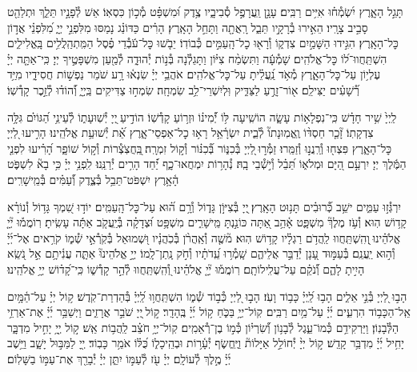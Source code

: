 \documentclass[twoside, openany, parskip=half, 11pt]{book}
\begin{document}
תָּגֵ֣ל הָאָ֑רֶץ יִ֝שְׂמְ֯ח֗וּ אִיִּ֥ים רַבִּֽים׃
עָנָ֣ן וַֽעֲרָפֶ֣ל סְ֯בִיבָ֑יו צֶ֥דֶק וּ֝מִשְׁפָּ֗ט מְ֯כ֣וֹן כִּסְאֽוֹ׃
אֵשׁ לְ֯פָנָ֣יו תֵּלֵ֑ךְ וּתְלַהֵ֖ט סָבִ֣יב צָרָֽיו׃
הֵאִ֣ירוּ בְ֯רָקָ֣יו תֵּבֵ֑ל רָֽאֲתָ֖ה וַתָּחֵ֣ל הָאָֽרֶץ׃
הָרִ֗ים כַּדּוֹנַ֗ג נָמַסּוּ מִלִּפְנֵ֣י יְיָ֑ מִ֝לִּפְנֵ֗י אֲד֣וֹן כׇּל־הָאָֽרֶץ׃
הִגִּ֣ידוּ הַשָּׁמַ֣יִם צִדְק֑וֹ וְ֯רָא֖וּ כׇל־הָֽעַמִּ֣ים כְּ֯בוֹדֽוֹ׃
יֵבֹ֤שׁוּ כׇּל־עֹ֬בְ֯דֵי פֶ֗סֶל הַמִּֽתְהַֽלֲלִ֥ים בָּֽאֱלִילִ֑ים הִשְׁתַּֽחֲווּ־ל֝וֹ כׇּל־אֱלֹהִֽים׃
שָׁמְ֯עָ֬ה וַתִּשְׂמַ֨ח צִיּ֗וֹן וַתָּגֵלְ֯נָה בְּ֯נ֣וֹת יְ֯הוּדָ֑ה לְ֯מַ֖עַן מִשְׁפָּטֶ֣יךָ יְיָ׃
כִּֽי־אַתָּ֤ה יְיָ֗ עֶלְי֥וֹן עַל־כׇּל־הָאָ֑רֶץ מְ֯אֹ֥ד נַֽ֝עֲלֵ֗יתָ עַל־כׇּל־אֱלֹהִֽים׃
אֹהֲבֵ֥י יְיָ֗ שִׂנְא֫וּ רָ֥ע שֹׁמֵר נַפְשׁ֣וֹת חֲסִידָ֑יו מִיַּ֥ד רְ֝֯שָׁעִ֗ים יַצִּילֵֽם׃
א֖וֹר־זָרֻ֣עַ לַצַּדִּ֑יק וּֽלְיִשְׁרֵי־לֵ֥ב שִׂמְחָֽה׃
שִׂמְח֣וּ צַדִּיקִים בַּֽיְיָ֑ וְ֝֯הוֹד֗וּ לְ֯זֵ֣כֶר קָדְ֯שֽׁוֹ׃


לַֽיְיָ֙ שִׁ֥יר חָדָ֗שׁ כִּֽי־נִפְלָא֥וֹת עָשָׂ֑ה הוֹשִֽׁיעָה לּ֥וֹ יְ֝֯מִינ֗וֹ וּזְר֥וֹעַ קָדְ֯שֽׁוֹ׃
הוֹדִ֣יעַ ֖יְיָ יְ֯שֽׁוּעָת֑וֹ לְ֯עֵינֵ֥י הַ֝גּוֹיִ֗ם גִּלָּ֥ה צִדְקָתֽוֹ׃
זָ֘כַ֤ר חַסְדּ֨וֹ וֶֽאֱמֽוּנָתוֹ֘ לְ֯בֵ֢ית יִשְׂרָ֫אֵ֥ל רָא֥וּ כׇל־אַפְסֵי־אָ֑רֶץ אֵ֝֗ת יְ֯שׁוּעַ֥ת אֱלֹהֵֽינוּ׃
הָרִ֣יעוּ לַ֭יְיָ כׇּל־הָאָ֑רֶץ פִּצְח֖וּ וְ֯רַֽנֲנ֣וּ וְ֯זַמֵּֽרוּ׃
זַמְּ֯ר֣וּ ֖לַיְיָ בְּ֯כִנּ֑וֹר בְּ֝֯כִנּ֗וֹר וְ֯ק֣וֹל זִמְרָֽה׃
֖בַּֽחֲצֹֽצְ֯רוֹת וְ֯ק֣וֹל שׁוֹפָ֑ר הָ֝רִ֗יעוּ לִפְנֵ֤י הַמֶּ֬לֶךְ יְיָ׃
יִרְעַ֣ם הַ֭יָּם וּמְלֹא֑וֹ תֵּ֝בֵ֗ל וְ֯י֣שְׁ֯בֵי בָֽהּ׃
נְ֯הָר֥וֹת יִמְחֲאוּ־כָ֑ף יַ֝֗חַד הָרִ֥ים יְ֯רַנֵּֽנוּ׃
לִֽפְנֵ֥י יְיָ֗ כִּ֥י בָא֘ לִשְׁפֹּ֢ט הָ֫אָ֥רֶץ יִשְׁפֹּט־תֵּבֵ֥ל בְּ֯צֶ֑דֶק וְ֝֯עַמִּ֗ים בְּ֯מֵֽישָׁרִֽים׃

יִרְגְּ֯ז֣וּ עַמִּ֑ים ישֵׁ֥ב כְּ֝֯רוּבִ֗ים תָּנ֥וּט הָאָֽרֶץ׃
֖יְיָ בְּ֯צִיּוֹ֣ן גָּד֑וֹל וְ֯רָ֥ם ה֝֗וּא עַל־כׇּל־הָֽעַמִּֽים׃
יוֹד֣וּ שִׁ֭מְךָ גָּד֥וֹל וְ֯נוֹרָ֗א קָד֥וֹשׁ הֽוּא׃
וְ֯עֹ֥ז מֶלֶךְ֘ מִשְׁפָּ֢ט אָ֫הֵ֥ב אַ֭תָּה כּוֹנַ֣נְתָּ מֵּֽישָׁרִ֑ים מִשְׁפָּ֥ט וּ֝צְדָקָ֗ה בְּ֯יַֽעֲקֹ֤ב אַתָּ֬ה עָשִֽׂיתָ׃
רֽוֹמֲמ֡וּ יְ֘יָ֤ אֱלֹהֵ֗ינוּ ֖וְהִֽשְׁתַּֽחֲווּ לַֽהֲדֹ֥ם רַגְלָ֗יו קָד֥וֹשׁ הֽוּא׃
מ֘שֶׁ֤ה וְ֯אַֽהֲרֹ֨ן בְּ֯כֹֽהֲנָ֗יו וּ֭שְׁמוּאֵל בְּ֯קֹֽרְ֯אֵ֣י שְׁ֯מ֑וֹ קֹרִ֥אים אֶל־יְ֜יָ֗ וְ֯ה֣וּא יַֽעֲנֵֽם׃
בְּ֯עַמּ֣וּד עָ֭נָן יְ֯דַבֵּ֣ר אֲלֵיהֶ֑ם שָֽׁמְ֯ר֥וּ עֵֽ֝דֹתָ֗יו וְ֯חֹ֣ק נָֽתַן־לָֽמוֹ׃
יְיָ֣ אֱלֹהֵינוּ֘ אַתָּ֢ה עֲנִ֫יתָ֥ם אֵ֣ל נֹ֭שֵֽׂא הָיִ֣יתָ לָהֶ֑ם וְ֝֯נֹקֵ֗ם עַל־עֲלִֽילוֹתָֽם׃
רֽוֹמֲמ֡וּ יְ֘יָ֤ אֱלֹהֵ֗ינוּ וְ֭֯הִֽשְׁתַּֽחֲווּ לְ֯הַ֣ר קָדְ֯שׁ֑וֹ כִּֽי־קָ֝ד֗וֹשׁ יְיָ֥ אֱלֹהֵֽינוּ׃

הָב֣וּ לַ֭יְיָ בְּ֯נֵ֣י אֵלִ֑ים הָב֥וּ לַֽ֝יְיָ֗ כָּב֥וֹד וָעֹֽז׃
הָב֣וּ לַ֭יְיָ כְּ֯ב֣וֹד שְׁ֯מ֑וֹ הִשְׁתַּֽחֲו֥וּ לַֽ֝יְיָ֗ בְּ֯הַדְרַת־קֹֽדֶשׁ׃
ק֥וֹל יְיָ֗ עַל־הַ֫מָּ֥יִם אֵֽל־הַכָּב֥וֹד הִרְעִ֑ים יְ֜יָ֗ עַל־מַ֥יִם רַבִּֽים׃
קֽוֹל־יְיָ֥ בַּכֹּ֑חַ ק֥וֹל יְ֜יָ֗ בֶּֽהָדָֽר׃
ק֣וֹל ֖יְיָ שֹׁבֵ֣ר אֲרָזִ֑ים וַיְשַׁבֵּ֥ר יְ֜יָ֗ אֶת־אַרְזֵ֥י הַלְּ֯בָנֽוֹן׃
וַיַּרְקִידֵ֥ם כְּ֯מוֹ־עֵ֑גֶל לְ֯בָנ֥וֹן וְ֝֯שִׂרְי֗וֹן כְּ֯מ֣וֹ בֶן־רְ֯אֵמִֽים׃
קֽוֹל־יְיָ֥ חֹצֵ֗ב לַֽהֲב֥וֹת אֵֽשׁ׃
ק֣וֹל יְ֖יָ֥ יָחִ֣יל מִדְבָּ֑ר יָחִ֥יל יְ֜יָ֗ מִדְבַּ֥ר קָדֵֽשׁ׃
ק֣וֹל יְיָ֨ יְ֯חוֹלֵ֣ל אַיָּלוֹת֘ וַיֶּֽחֱשׂ֢ף יְ֯עָ֫ר֥וֹת וּבְהֵֽיכָל֑וֹ כֻּ֝לּ֗וֹ אֹמֵ֥ר כָּבֽוֹד׃
יְ֖יָ לַמַּבּ֣וּל יָשָׁ֑ב וַיֵּ֥שֶׁב יְ֜יָ֗ מֶ֣לֶךְ לְ֯עוֹלָֽם׃
יְיָ֗ עֹ֖ז לְ֯עַמּ֣וֹ יִתֵּ֑ן יְיָ֓ יְ֯בָרֵ֖ךְ אֶת־עַמּ֣וֹ בַשָּׁלֽוֹם׃
\end{document}
